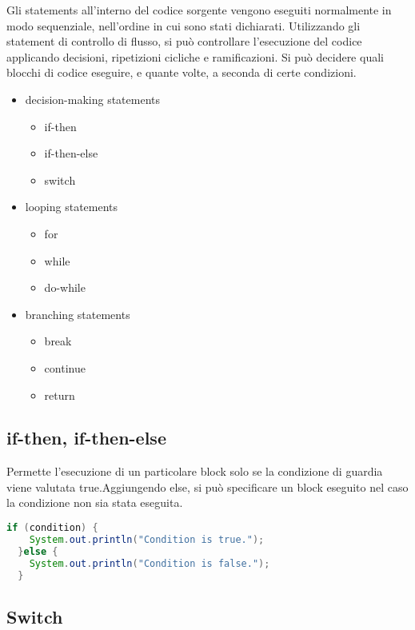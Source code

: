 \documentclass[a4paper,12pt,twoside]{book}
\begin{document}
Gli statements all’interno del codice sorgente vengono eseguiti
normalmente in modo sequenziale, nell’ordine in cui sono stati
dichiarati. Utilizzando gli statement di controllo di flusso, si può
controllare l’esecuzione del codice applicando decisioni, ripetizioni
cicliche e ramificazioni. Si può decidere quali blocchi di codice
eseguire, e quante volte, a seconda di certe condizioni.
\begin{itemize}
\item decision-making statements
  \begin{itemize}
  \item if-then
  \item if-then-else
  \item switch
  \end{itemize}
\item looping statements
  \begin{itemize} 
  \item for
  \item while
  \item do-while
  \end{itemize}
\item branching statements
  \begin{itemize}
  \item break
  \item continue
  \item return
  \end{itemize}
\end{itemize}

\subsection{if-then, if-then-else}
Permette l’esecuzione di un particolare block solo se la condizione di
guardia viene valutata true.Aggiungendo else, si può specificare un
block eseguito nel caso la condizione non sia stata eseguita.

\begin{lstlisting}[caption={if-then},
  label={lst:ifthen},language=Java]
  if (condition) {
    System.out.println("Condition is true.");
  }else {
    System.out.println("Condition is false.");
  }
\end{lstlisting}

\subsection{Switch}
\end{document}
